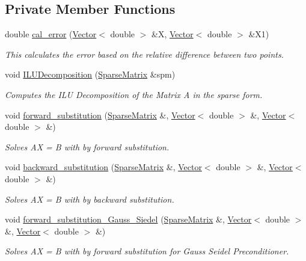\subsection*{Private Member Functions}
\begin{DoxyCompactItemize}
\item 
double \hyperlink{class_iterative___solver_aa7791b558e5275c24a8c83f2c2a7f3dc}{cal\+\_\+error} (\hyperlink{class_vector}{Vector}$<$ double $>$ \&X, \hyperlink{class_vector}{Vector}$<$ double $>$ \&X1)
\begin{DoxyCompactList}\small\item\em This calculates the error based on the relative difference between two points. \end{DoxyCompactList}\item 
void \hyperlink{class_iterative___solver_a5ea23a7eeb6b249e72135b29dfa999c6}{I\+L\+U\+Decomposition} (\hyperlink{class_sparse_matrix}{Sparse\+Matrix} \&spm)
\begin{DoxyCompactList}\small\item\em Computes the I\+L\+U Decomposition of the Matrix A in the sparse form. \end{DoxyCompactList}\item 
void \hyperlink{class_iterative___solver_a78d512adb0d8bc5c57ba25fd6f108b4d}{forward\+\_\+substitution} (\hyperlink{class_sparse_matrix}{Sparse\+Matrix} \&, \hyperlink{class_vector}{Vector}$<$ double $>$ \&, \hyperlink{class_vector}{Vector}$<$ double $>$ \&)
\begin{DoxyCompactList}\small\item\em Solves A\+X = B with by forward substitution. \end{DoxyCompactList}\item 
void \hyperlink{class_iterative___solver_a64e45de652219f1e8f81cb6a0b8a2471}{backward\+\_\+substitution} (\hyperlink{class_sparse_matrix}{Sparse\+Matrix} \&, \hyperlink{class_vector}{Vector}$<$ double $>$ \&, \hyperlink{class_vector}{Vector}$<$ double $>$ \&)
\begin{DoxyCompactList}\small\item\em Solves A\+X = B with by backward substitution. \end{DoxyCompactList}\item 
void \hyperlink{class_iterative___solver_af1b218cc13ec99a6b102036aa9a7ee56}{forward\+\_\+substitution\+\_\+\+Gauss\+\_\+\+Siedel} (\hyperlink{class_sparse_matrix}{Sparse\+Matrix} \&, \hyperlink{class_vector}{Vector}$<$ double $>$ \&, \hyperlink{class_vector}{Vector}$<$ double $>$ \&)
\begin{DoxyCompactList}\small\item\em Solves A\+X = B with by forward substitution for Gauss Seidel Preconditioner. \end{DoxyCompactList}\end{DoxyCompactItemize}
